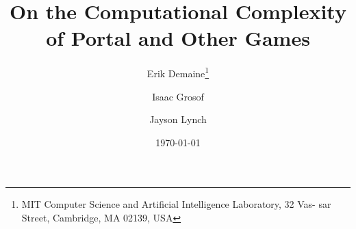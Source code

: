 \documentclass[11pt,twoside]{article}
\begin{document}
\title{On the Computational Complexity of Portal and Other Games}
\author{Erik Demaine\thanks{MIT Computer Science and Artificial Intelligence Laboratory, 32 Vas-
sar Street, Cambridge, MA 02139, USA} \and Isaac Grosof\footnotemark[1]  \and Jayson Lynch\footnotemark[1]}
\date{\today}
\maketitle



%
%
%

%
%

%

%









{}
\end{document}
